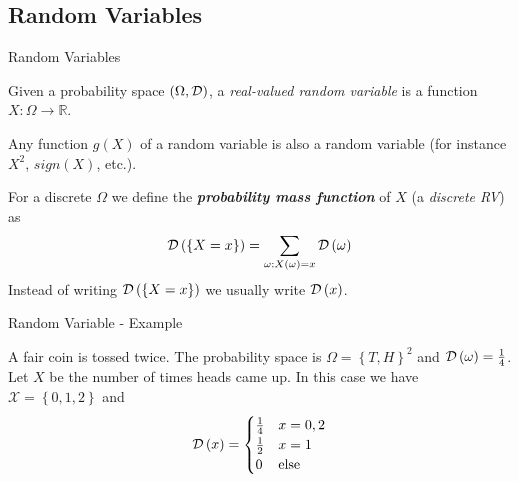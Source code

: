 \documentclass[11pt, usenames, dvipsnames]{beamer}
\begin{document}
\subsection{Random Variables}

\begin{frame}{Random Variables}

\begin{definition}
Given a probability space $\left(\Omega,\mathcal{D}\right)$, a \textit{real-valued
random variable} is a function $X:\Omega\rightarrow\mathbb{R}$.
\end{definition}

\pause

\begin{remark}
Any function $g\left(X\right)$ of a random variable is also a random
variable (for instance $X^{2}$, $sign\left(X\right)$, etc.).
\end{remark}

\pause

For a discrete $\Omega$ we define the \textbf{\textit{probability
mass function}} of $X$ (a \textit{discrete RV}) as 
\[
\mathcal{D}\left(\left\{ X=x\right\} \right)=\sum_{\omega:X\left(\omega\right)=x}\mathcal{D}\left(\omega\right)
\]
Instead of writing $\mathcal{D}\left(\left\{ X=x\right\} \right)$ we usually
write $\mathcal{D}\left(x\right)$.
\end{frame}

\begin{frame}{Random Variable - Example}
\begin{example}
A fair coin is tossed twice. The probability space  is $\Omega=\left\{ T,H\right\} ^{2}$
and $\mathcal{D}\left(\omega\right)=\frac{1}{4}$. Let $X$ be the number of
times heads came up. In this case we have $\mathcal{X}=\left\{ 0,1,2\right\} $
and
\[
\mathcal{D}\left(x\right)=\begin{cases}
\frac{1}{4} & x=0,2\\
\frac{1}{2} & x=1\\
0 & \mbox{else}
\end{cases}
\]
\end{example}
\end{frame}
\end{document}
